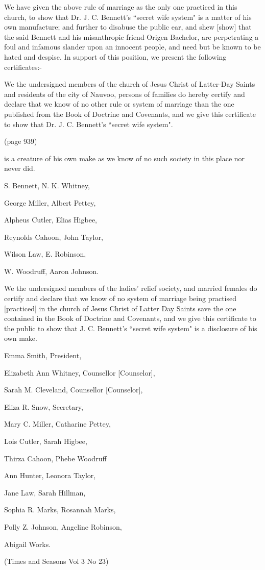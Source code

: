We have given the above rule of marriage as the only one practiced in this church, to
show that Dr. J. C. Bennett's ``secret wife system" is a matter of his own
manufacture; and further to disabuse the public ear, and shew [show] that the said
Bennett and his misanthropic friend Origen Bachelor, are perpetrating a foul and
infamous slander upon an innocent people, and need but be known to be hated and
despise. In support of this position, we present the following certificates:-

We the undersigned members of the church of Jesus Christ of Latter-Day Saints and
residents of the city of Nauvoo, persons of families do hereby certify and declare
that we know of no other rule or system of marriage than the one published from the
Book of Doctrine and Covenants, and we give this certificate to show that Dr. J. C.
Bennett's ``secret wife system".

(page 939)

is a creature of his own make as we know of no such society in this place nor never 
did.

S. Bennett, N. K. Whitney,

George Miller, Albert Pettey,

Alpheus Cutler, Elias Higbee,

Reynolds Cahoon, John Taylor,

Wilson Law, E. Robinson,

W. Woodruff, Aaron Johnson.

We the undersigned members of the ladies' relief society, and married females do
certify and declare that we know of no system of marriage being practised [practiced]
in the church of Jesus Christ of Latter Day Saints save the one contained in the Book
of Doctrine and Covenants, and we give this certificate to the public to show that J.
C. Bennett's ``secret wife system" is a disclosure of his own make.

Emma Smith, President,

Elizabeth Ann Whitney, Counsellor [Counselor],

Sarah M. Cleveland, Counsellor [Counselor],

Eliza R. Snow, Secretary,

Mary C. Miller, Catharine Pettey,

Lois Cutler, Sarah Higbee,

Thirza Cahoon, Phebe Woodruff

Ann Hunter, Leonora Taylor,

Jane Law, Sarah Hillman,

Sophia R. Marks, Rosannah Marks,

Polly Z. Johnson, Angeline Robinson,

Abigail Works.

(Times and Seasons Vol 3 No 23)